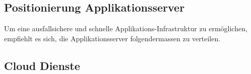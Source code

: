 \subsection{Positionierung Applikationsserver}

Um eine ausfallsichere und schnelle Applikations-Infrastruktur zu ermöglichen, empfiehlt es sich, die Applikationsserver folgendermassen zu verteilen.

\subsection{Cloud Dienste}



